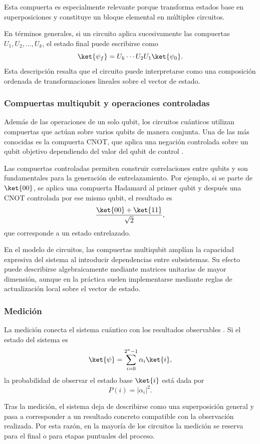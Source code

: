 Esta compuerta es especialmente relevante porque transforma estados base en superposiciones y constituye un bloque elemental en múltiples circuitos.

En términos generales, si un circuito aplica sucesivamente las compuertas $U_1, U_2, \ldots, U_k$, el estado final puede escribirse como
\[
    \ket{\psi_f} = U_k \cdots U_2 U_1 \ket{\psi_0}.
\]
Esta descripción resalta que el circuito puede interpretarse como una composición ordenada de transformaciones lineales sobre el vector de estado.

\subsubsection{Compuertas multiqubit y operaciones controladas}

Además de las operaciones de un solo qubit, los circuitos cuánticos utilizan compuertas que actúan sobre varios qubits de manera conjunta. Una de las más conocidas es la compuerta CNOT, que aplica una negación controlada sobre un qubit objetivo dependiendo del valor del qubit de control \cite{Nielsen2010}.

Las compuertas controladas permiten construir correlaciones entre qubits y son fundamentales para la generación de entrelazamiento. Por ejemplo, si se parte de $\ket{00}$, se aplica una compuerta Hadamard al primer qubit y después una CNOT controlada por ese mismo qubit, el resultado es
\[
    \frac{\ket{00} + \ket{11}}{\sqrt{2}},
\]
que corresponde a un estado entrelazado.

En el modelo de circuitos, las compuertas multiqubit amplían la capacidad expresiva del sistema al introducir dependencias entre subsistemas. Su efecto puede describirse algebraicamente mediante matrices unitarias de mayor dimensión, aunque en la práctica suelen implementarse mediante reglas de actualización local sobre el vector de estado.

\subsubsection{Medición}

La medición conecta el sistema cuántico con los resultados observables \cite{Nielsen2010}. Si el estado del sistema es
\[
    \ket{\psi} = \sum_{i=0}^{2^n-1} \alpha_i \ket{i},
\]
la probabilidad de observar el estado base $\ket{i}$ está dada por
\[
    P(i) = |\alpha_i|^2.
\]

Tras la medición, el sistema deja de describirse como una superposición general y pasa a corresponder a un resultado concreto compatible con la observación realizada. Por esta razón, en la mayoría de los circuitos la medición se reserva para el final o para etapas puntuales del proceso.

